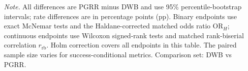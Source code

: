 \begin{table}[t]
\parbox{0.98\textwidth}{\footnotesize \emph{Note.} All differences are PGRR minus DWB
and use 95\% percentile-bootstrap intervals; rate differences are in percentage points (pp).
Binary endpoints use exact McNemar tests and the Haldane-corrected matched odds ratio
$\mathrm{OR}_H$; continuous endpoints use Wilcoxon signed-rank tests and matched
rank-biserial correlation $r_{\mathrm{rb}}$. Holm correction covers all endpoints in this
table. The paired sample size varies for success-conditional metrics. Comparison set:
DWB vs PGRR.}
\end{table}
